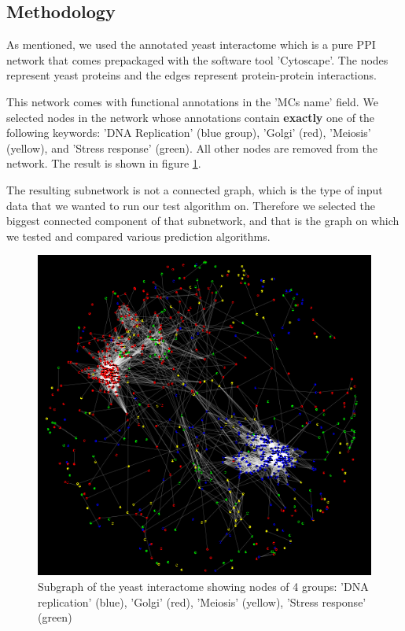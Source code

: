 \subsection{Methodology}
As mentioned, we 
used the annotated yeast interactome which is a pure PPI network that comes
prepackaged with the
software tool 'Cytoscape'. The nodes represent yeast proteins and the edges
represent protein-protein interactions.

This network comes with functional annotations in the 'MCs name' field.
We selected nodes in the network whose annotations contain
\textbf{exactly} one of the following keywords:  'DNA Replication' (blue
group), 'Golgi' (red), 'Meiosis' (yellow), and 'Stress response'
(green). All other nodes are removed from the network.  The result is
shown in figure \ref{fig:yeast_subgraph_4groups}.

The resulting subnetwork is not a connected graph, which is the type
of input data that we wanted to run our test algorithm on. Therefore
we selected the biggest connected component of that subnetwork, and
that is the graph on which we tested and compared various prediction
algorithms.

\begin{figure}
\begin{framed}
\centering
\includegraphics[width=\textwidth]{figures/yeastsubgraph_4_groups_colorcode.png}
\caption{Subgraph of the yeast interactome showing nodes of 4 groups: 'DNA
replication' (blue), 'Golgi' (red), 'Meiosis' (yellow), 'Stress response'
(green)}
\label{fig:yeast_subgraph_4groups}
\end{framed}
\end{figure}

